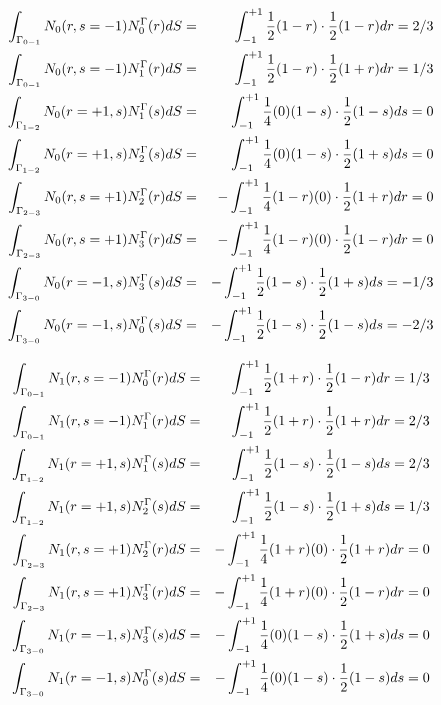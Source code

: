 \newpage 
\begin{eqnarray}
\int_{\Gamma_{0-1}} N_0(r,s=-1) N_0^\Gamma(r) dS  &=&  \int_{-1}^{+1}\frac{1}{2}(1-r) \cdot  \frac{1}{2}(1-r) dr= 2/3 \nonumber\\
\int_{\Gamma_{0-1}} N_0(r,s=-1) N_1^\Gamma(r) dS  &=&  \int_{-1}^{+1}\frac{1}{2}(1-r) \cdot  \frac{1}{2}(1+r) dr= 1/3 \nonumber\\
\int_{\Gamma_{1-2}} N_0(r=+1,s) N_1^\Gamma(s) dS  &=&  \int_{-1}^{+1}\frac{1}{4}(0)(1-s) \cdot  \frac{1}{2}(1-s) ds=0 \nonumber\\
\int_{\Gamma_{1-2}} N_0(r=+1,s) N_2^\Gamma(s) dS  &=&  \int_{-1}^{+1}\frac{1}{4}(0)(1-s) \cdot  \frac{1}{2}(1+s) ds=0 \nonumber\\
\int_{\Gamma_{2-3}} N_0(r,s=+1) N_2^\Gamma(r) dS  &=&  -\int_{-1}^{+1}\frac{1}{4}(1-r)(0) \cdot  \frac{1}{2}(1+r) dr=0 \nonumber\\
\int_{\Gamma_{2-3}} N_0(r,s=+1) N_3^\Gamma(r) dS  &=&  -\int_{-1}^{+1}\frac{1}{4}(1-r)(0) \cdot  \frac{1}{2}(1-r) dr=0 \nonumber\\
\int_{\Gamma_{3-0}} N_0(r=-1,s) N_3^\Gamma(s) dS  &=&  -\int_{-1}^{+1}\frac{1}{2}(1-s) \cdot  \frac{1}{2}(1+s) ds= -1/3 \nonumber\\
\int_{\Gamma_{3-0}} N_0(r=-1,s) N_0^\Gamma(s) dS  &=&  -\int_{-1}^{+1}\frac{1}{2}(1-s) \cdot  \frac{1}{2}(1-s) ds= -2/3 \nonumber
\end{eqnarray}

\begin{eqnarray}
\int_{\Gamma_{0-1}} N_1(r,s=-1) N_0^\Gamma(r) dS  &=&  \int_{-1}^{+1} \frac{1}{2}(1+r)     \cdot  \frac{1}{2}(1-r) dr= 1/3\nonumber\\
\int_{\Gamma_{0-1}} N_1(r,s=-1) N_1^\Gamma(r) dS  &=&  \int_{-1}^{+1} \frac{1}{2}(1+r)     \cdot  \frac{1}{2}(1+r) dr= 2/3\nonumber\\
\int_{\Gamma_{1-2}} N_1(r=+1,s) N_1^\Gamma(s) dS  &=&  \int_{-1}^{+1} \frac{1}{2}(1-s)     \cdot  \frac{1}{2}(1-s) ds= 2/3\nonumber\\
\int_{\Gamma_{1-2}} N_1(r=+1,s) N_2^\Gamma(s) dS  &=&  \int_{-1}^{+1} \frac{1}{2}(1-s)     \cdot  \frac{1}{2}(1+s) ds= 1/3\nonumber\\
\int_{\Gamma_{2-3}} N_1(r,s=+1) N_2^\Gamma(r) dS  &=&  -\int_{-1}^{+1}\frac{1}{4}(1+r)(0)  \cdot  \frac{1}{2}(1+r) dr= 0\nonumber\\
\int_{\Gamma_{2-3}} N_1(r,s=+1) N_3^\Gamma(r) dS  &=&  -\int_{-1}^{+1}\frac{1}{4}(1+r)(0)  \cdot  \frac{1}{2}(1-r) dr= 0\nonumber\\
\int_{\Gamma_{3-0}} N_1(r=-1,s) N_3^\Gamma(s) dS  &=&  -\int_{-1}^{+1}\frac{1}{4}(0)(1-s)  \cdot  \frac{1}{2}(1+s) ds= 0\nonumber\\
\int_{\Gamma_{3-0}} N_1(r=-1,s) N_0^\Gamma(s) dS  &=&  -\int_{-1}^{+1}\frac{1}{4}(0)(1-s)  \cdot  \frac{1}{2}(1-s) ds= 0\nonumber
\end{eqnarray}

